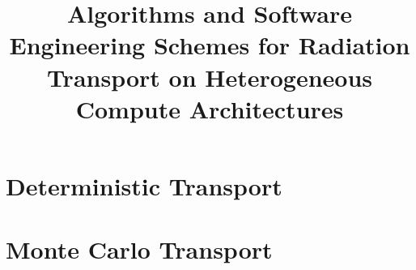 \documentclass[11pt,onehalf]{beavtex}
\title{Algorithms and Software Engineering Schemes for Radiation Transport on Heterogeneous Compute Architectures}
\author{\TheAuthors{}}
\newcommand{\TheAuthors}{Joanna Piper Morgan}
\begin{document}
\maketitle

\mainmatter



\newcommand{\TheTitle}{BLANK}
\renewcommand{\TheAuthors}{BLANK}
\newcommand{\TheAddress}{BLANK}





\part{Deterministic Transport}
\label{part:determ}






\part{Monte Carlo Transport}
\label{part:mc}









\newpage



\printbibliography[]


\appendix


\newpage

\newpage

\newpage

\end{document}
